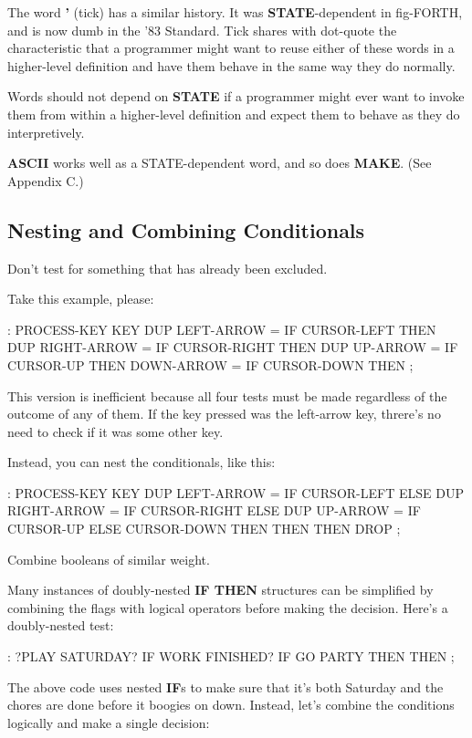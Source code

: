 The word \textbf{'} (tick) has a similar history. It was \textbf{STATE}-dependent in
fig-FORTH, and is now dumb in the '83 Standard. Tick shares with
dot-quote the characteristic that a programmer might want to reuse either of
these words in a higher-level definition and have them behave in the same
way they do normally.

\begin{tip}
Words should not depend on \textbf{STATE} if a programmer might ever want to
invoke them from within a higher-level definition and expect them to
behave as they do interpretively.
\end{tip}
\textbf{ASCII} works well as a STATE-dependent word, and so does \textbf{MAKE}.
(See Appendix C.)

\subsection{Nesting and Combining Conditionals}
\begin{tip}
Don't test for something that has already been excluded.
\end{tip}
Take this example, please:

\begin{Code}
: PROCESS-KEY
   KEY  DUP  LEFT-ARROW  =  IF CURSOR-LEFT  THEN
        DUP  RIGHT-ARROW =  IF CURSOR-RIGHT THEN
        DUP  UP-ARROW    =  IF CURSOR-UP    THEN
             DOWN-ARROW  =  IF CURSOR-DOWN  THEN ;
\end{Code}
This version is inefficient because all four tests must be made regardless
of the outcome of any of them. If the key pressed was the left-arrow key,
threre's no need to check if it was some other key.

Instead, you can nest the conditionals, like this:

\begin{Code}
: PROCESS-KEY
   KEY  DUP  LEFT-ARROW  =  IF CURSOR-LEFT  ELSE
        DUP  RIGHT-ARROW =  IF CURSOR-RIGHT ELSE
        DUP  UP-ARROW    =  IF CURSOR-UP    ELSE
                               CURSOR-DOWN
           THEN THEN THEN  DROP ;
\end{Code}
\begin{tip}
Combine booleans of similar weight.
\end{tip}
Many instances of doubly-nested \textbf{IF THEN} structures can be simplified
by combining the flags with logical operators before making the decision.
Here's a doubly-nested test:

\begin{Code}
: ?PLAY   SATURDAY? IF  WORK FINISHED? IF
     GO PARTY  THEN  THEN ;
\end{Code}
The above code uses nested \textbf{IF}s to make sure that it's both Saturday and
the chores are done before it boogies on down. Instead, let's combine the
conditions logically and make a single decision:

